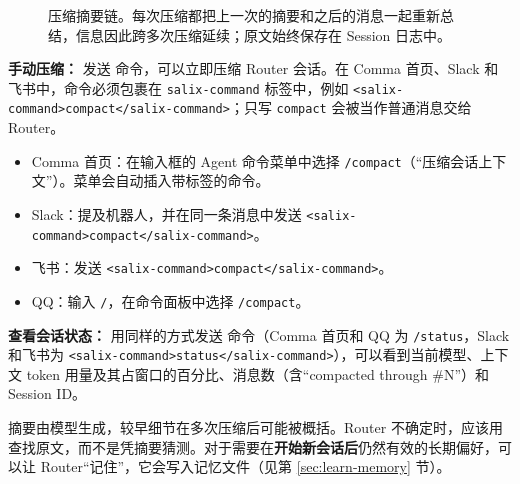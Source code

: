 \documentclass[UTF8,a4paper,11pt]{ctexart}
\begin{document}
\begin{figure}[H]
\caption{压缩摘要链。每次压缩都把上一次的摘要和之后的消息一起重新总结，信息因此跨多次压缩延续；原文始终保存在 Session 日志中。}
\label{fig:compaction}
\end{figure}

\textbf{手动压缩：} 发送  命令，可以立即压缩 Router 会话。在 Comma 首页、Slack 和飞书中，命令必须包裹在 \texttt{salix-command} 标签中，例如 \texttt{<salix-command>compact</salix-command>}；只写 \texttt{compact} 会被当作普通消息交给 Router。

\begin{itemize}
  \item Comma 首页：在输入框的 Agent 命令菜单中选择 \texttt{/compact}（“压缩会话上下文”）。菜单会自动插入带标签的命令。
  \item Slack：提及机器人，并在同一条消息中发送 \texttt{<salix-command>compact</salix-command>}。
  \item 飞书：发送 \texttt{<salix-command>compact</salix-command>}。
  \item QQ：输入 \texttt{/}，在命令面板中选择 \texttt{/compact}。
\end{itemize}

\textbf{查看会话状态：} 用同样的方式发送  命令（Comma 首页和 QQ 为 \texttt{/status}，Slack 和飞书为 \texttt{<salix-command>status</salix-command>}），可以看到当前模型、上下文 token 用量及其占窗口的百分比、消息数（含“compacted through \#N”）和 Session ID。

\begin{note}[摘要与原文]
摘要由模型生成，较早细节在多次压缩后可能被概括。Router 不确定时，应该用  查找原文，而不是凭摘要猜测。对于需要在\textbf{开始新会话后}仍然有效的长期偏好，可以让 Router“记住”，它会写入记忆文件（见第 \ref{sec:learn-memory} 节）。
\end{note}
\end{document}
